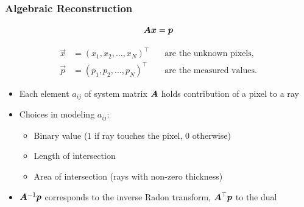 \begin{frame}
	\frametitle{Algebraic Reconstruction}

	\begin{equation}
		\label{eqn:ct_algebraic_1}
		\bm A\boldsymbol{x} = \boldsymbol{p}
	\end{equation}

	\begin{eqnarray*}
		\vec{x} &= (x_1, x_2,...,x_N)^\top &\quad \text{are the unknown pixels,} \\
		\vec{p} &= (p_1, p_2,...,p_N)^\top &\quad \text{are the measured values.}
	\end{eqnarray*}

	\begin{itemize}
		\item Each element $a_{ij}$ of system matrix $\bm A$ holds contribution of a pixel to a ray
		\item Choices in modeling $a_{ij}$:
		      \begin{itemize}
			      \item Binary value ($1$ if ray touches the pixel, $0$ otherwise)
			      \item Length of intersection
			      \item Area of intersection (rays with non-zero thickness)
		      \end{itemize}
		\item $\bm A^{-1} \boldsymbol{p}$ corresponds to the inverse Radon transform, $\bm A^\top \boldsymbol{p}$ to the dual
	\end{itemize}
\end{frame}

